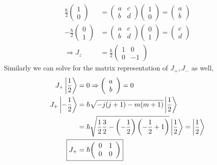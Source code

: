 \documentclass{school-22.101-notes}
\begin{document}
\begin{align}
  \frac{\hbar}{2}  \left( \begin{array}{c} 1 \\ 0 \end{array} \right) &=  \left( \begin{array}{cc} a & c \\ b & d   \end{array} \right)  \left( \begin{array}{c} 1 \\ 0 \end{array} \right) = \left( \begin{array}{c} a \\ b \end{array} \right) \\
  - \frac{\hbar}{2}  \left( \begin{array}{c} 0 \\ 1 \end{array} \right) &=  \left( \begin{array}{cc} a & c \\ b & d   \end{array} \right)  \left( \begin{array}{c} 0 \\ 1 \end{array} \right) = \left( \begin{array}{c} c \\ d \end{array} \right) \\
  \Rightarrow J_z &= \frac{\hbar}{2} \left( \begin{array}{cc} 1 & 0 \\ 0 & -1 \end{array} \right) 
\end{align}
Similarly we can solve for the matrix representation of $J_+, J_-$ as well, 
\begin{align}
 J_+ \ket{ \frac{1}{2} } &= 0  \Rightarrow \left( \begin{array}{c} a \\ b \end{array} \right) = 0 \\
 J_+ \ket{ - \frac{1}{2} } &= \hbar \sqrt{-j(j+1) - m(m+1)} \ket{\frac{1}{2} }  \\
 &= \hbar \sqrt{ \frac{1}{2} \frac{3}{2} - \left( - \frac{1}{2} \right) \left( - \frac{1}{2} + 1 \right) } \ket{ \frac{1}{2} } = \ket{ \frac{1}{2} } \\
 \Aboxed{J_+ &= \hbar {\left( \begin{array}{cc} 0 & 1 \\ 0 & 0 \end{array} \right)}}
\end{align}
\end{document}
